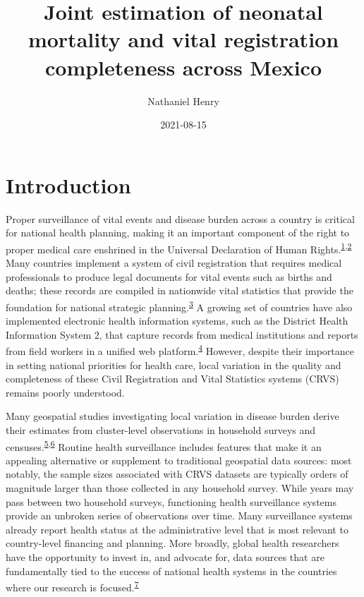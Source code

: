 \documentclass[
]{article}
\title{Joint estimation of neonatal mortality and vital registration completeness across Mexico}
\author{Nathaniel Henry\textsuperscript{}}
\date{2021-08-15}
\begin{document}
\maketitle

\hypertarget{introduction}{%
\section{Introduction}\label{introduction}}

Proper surveillance of vital events and disease burden across a country is critical for national health planning, making it an important component of the right to proper medical care enshrined in the Universal Declaration of Human Rights.\textsuperscript{\protect\hyperlink{ref-Mikkelsen2010}{1},\protect\hyperlink{ref-srs}{2}} Many countries implement a system of civil registration that requires medical professionals to produce legal documents for vital events such as births and deaths; these records are compiled in nationwide vital statistics that provide the foundation for national strategic planning.\textsuperscript{\protect\hyperlink{ref-Abouzahr2005}{3}} A growing set of countries have also implemented electronic health information systems, such as the District Health Information System 2, that capture records from medical institutions and reports from field workers in a unified web platform.\textsuperscript{\protect\hyperlink{ref-Dehnavieh2019}{4}} However, despite their importance in setting national priorities for health care, local variation in the quality and completeness of these Civil Registration and Vital Statistics systems (CRVS) remains poorly understood.

Many geospatial studies investigating local variation in disease burden derive their estimates from cluster-level observations in household surveys and censuses.\textsuperscript{\protect\hyperlink{ref-Diggle2016}{5},\protect\hyperlink{ref-Wakefield2020}{6}} Routine health surveillance includes features that make it an appealing alternative or supplement to traditional geospatial data sources: most notably, the sample sizes associated with CRVS datasets are typically orders of magnitude larger than those collected in any household survey. While years may pass between two household surveys, functioning health surveillance systems provide an unbroken series of observations over time. Many surveillance systems already report health status at the administrative level that is most relevant to country-level financing and planning. More broadly, global health researchers have the opportunity to invest in, and advocate for, data sources that are fundamentally tied to the success of national health systems in the countries where our research is focused.\textsuperscript{\protect\hyperlink{ref-AbouZahr2015}{7}}
\end{document}
